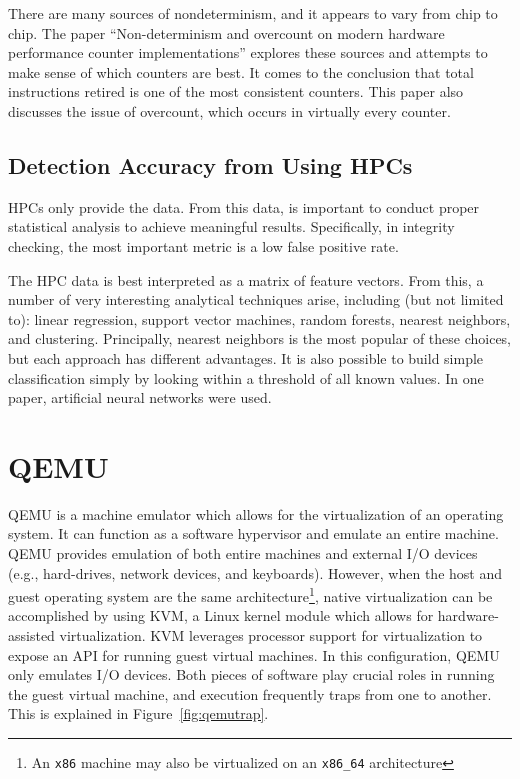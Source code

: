 \documentclass[notitlepage]{article}
\begin{document}
There are many sources of nondeterminism, and it appears to vary from chip to
chip. The paper ``Non-determinism and overcount on modern hardware performance
counter implementations'' explores these sources and attempts to make sense of
which counters are best. It comes to the conclusion that total instructions
retired is one of the most consistent counters\cite{overcount}. This paper also
discusses the issue of overcount, which occurs in virtually every counter.

\subsection{Detection Accuracy from Using HPCs}
HPCs only provide the data. From this data, is important to conduct proper
statistical analysis to achieve meaningful results. Specifically, in integrity
checking, the most important metric is a low false positive rate.

The HPC data is best interpreted as a matrix of feature vectors.  From this, a
number of very interesting analytical techniques arise, including (but not
limited to): linear regression, support vector machines, random forests, nearest
neighbors, and clustering. Principally, nearest neighbors is the most popular of
these choices, but each approach has different advantages\cite{forsyth}. It is
also possible to build simple classification simply by looking within a
threshold of all known values\cite{numchecker}. In one paper, artificial neural
networks were used\cite{feasibility}.

\section{QEMU}
\label{sec:qemu}
QEMU is a machine emulator which allows for the virtualization of an operating
system. It can function as a software hypervisor and emulate an entire machine.
QEMU provides emulation of both entire machines and external I/O devices (e.g.,
hard-drives, network devices, and keyboards). However, when the host and guest
operating system are the same architecture\footnote{An \texttt{x86} machine may
also be virtualized on an \texttt{x86\_64} architecture}, native virtualization
can be accomplished by using KVM, a Linux kernel module which allows for
hardware-assisted virtualization. KVM leverages processor support for
virtualization to expose an API for running guest virtual machines. In this
configuration, QEMU only emulates I/O devices.  Both pieces of software play
crucial roles in running the guest virtual machine, and execution frequently
traps from one to another. This is explained in Figure~\ref{fig:qemutrap}.
\end{document}
